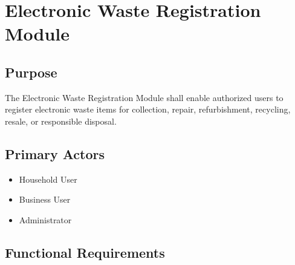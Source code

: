 \section{Electronic Waste Registration Module}
\label{sec:ewaste-registration}

\subsection{Purpose}

The Electronic Waste Registration Module shall enable authorized users
to register electronic waste items for collection, repair,
refurbishment, recycling, resale, or responsible disposal.

\subsection{Primary Actors}

\begin{itemize}
\item Household User
\item Business User
\item Administrator
\end{itemize}

\subsection{Functional Requirements}

